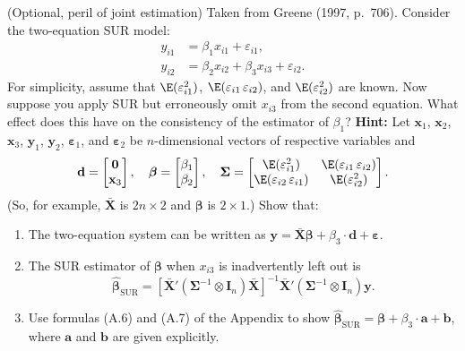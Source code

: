 \begin{problemset}
\exercise[9]
(Optional, peril of joint estimation)\quad
Taken from Greene (1997, p.~706). Consider the two-equation SUR model:
\begin{align*}
y_{i1} &= \beta_1 x_{i1} + \varepsilon_{i1}, \\
y_{i2} &= \beta_2 x_{i2} + \beta_3 x_{i3} + \varepsilon_{i2}.
\end{align*}
For simplicity, assume that $\E(\varepsilon_{i1}^2)$,
$\E(\varepsilon_{i1}\, \varepsilon_{i2})$, and $\E(\varepsilon_{i2}^2)$ are known.
Now suppose you apply SUR but erroneously omit $x_{i3}$ from the second equation.
What effect does this have on the consistency of the estimator of $\beta_1$?
\textbf{Hint:} Let $\mathbf{x}_1$, $\mathbf{x}_2$, $\mathbf{x}_3$,
$\mathbf{y}_1$, $\mathbf{y}_2$, $\boldsymbol{\varepsilon}_1$, and
$\boldsymbol{\varepsilon}_2$ be $n$-dimensional vectors of respective variables and
\[
\mathbf{d} = \begin{bmatrix} \mathbf{0} \\ \mathbf{x}_3 \end{bmatrix}, \quad
\boldsymbol{\beta} = \begin{bmatrix} \beta_1 \\ \beta_2 \end{bmatrix}, \quad
\boldsymbol{\Sigma} = \begin{bmatrix}
\E(\varepsilon_{i1}^2) & \E(\varepsilon_{i1}\, \varepsilon_{i2}) \\
\E(\varepsilon_{i2}\, \varepsilon_{i1}) & \E(\varepsilon_{i2}^2)
\end{bmatrix}.
\]
(So, for example, $\bar{\mathbf{X}}$ is $2n \times 2$ and $\boldsymbol{\beta}$ is
$2 \times 1$.) Show that:
\begin{enumerate}[label=(\alph*)]
\item The two-equation system can be written as
$\mathbf{y} = \bar{\mathbf{X}}\boldsymbol{\beta} + \beta_3 \cdot \mathbf{d}
+ \boldsymbol{\varepsilon}$.

\item The SUR estimator of $\boldsymbol{\beta}$ when $x_{i3}$ is inadvertently left
out is
\[
\hat{\boldsymbol{\beta}}_{\mathrm{SUR}}
= [\bar{\mathbf{X}}'(\boldsymbol{\Sigma}^{-1} \otimes \mathbf{I}_n)
\bar{\mathbf{X}}]^{-1}
\bar{\mathbf{X}}'(\boldsymbol{\Sigma}^{-1} \otimes \mathbf{I}_n)\mathbf{y}.
\]

\item Use formulas (A.6) and (A.7) of the Appendix to show
$\hat{\boldsymbol{\beta}}_{\mathrm{SUR}} = \boldsymbol{\beta} + \beta_3 \cdot \mathbf{a}
+ \mathbf{b}$,
where $\mathbf{a}$ and $\mathbf{b}$ are given explicitly.


\end{enumerate}
\end{problemset}
